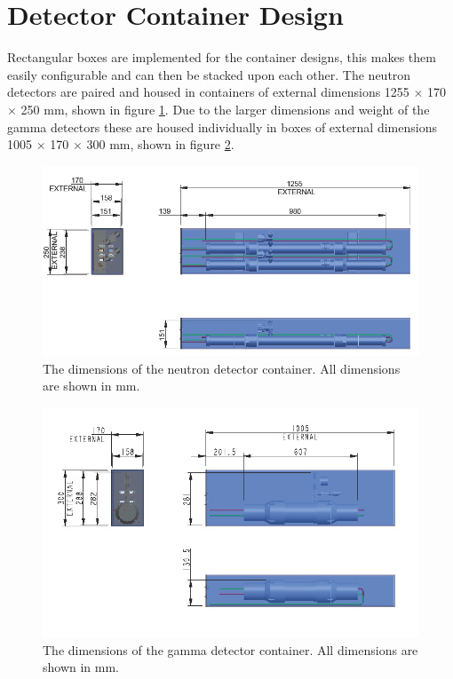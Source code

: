 \section{Detector Container Design}
Rectangular boxes are implemented for the container designs, this makes them easily configurable and can then be stacked upon each other. The neutron detectors are paired and housed in containers of external dimensions 1255 $\times$ 170 $\times$ 250 mm, shown in figure \ref{fig:neutronDetectorContainer}. Due to the larger dimensions and weight of the gamma detectors these are housed individually in boxes of external dimensions 1005 $\times$ 170 $\times$ 300 mm, shown in figure \ref{fig:gammaDetectorContainer}.

\begin{figure}[htbp]
\begin{center}
\includegraphics[width=140mm]{Chapter6/figures/neutronDetectorBoxGraphic.png}
\caption{The dimensions of the neutron detector container. All dimensions are shown in mm.}
\label{fig:neutronDetectorContainer}
\end{center}
\end{figure}

\begin{figure}[htbp]
\begin{center}
\includegraphics[width=140mm]{Chapter6/figures/gammaDetectorBoxGraphic.png}
\caption{The dimensions of the gamma detector container. All dimensions are shown in mm.}
\label{fig:gammaDetectorContainer}
\end{center}
\end{figure}
  
